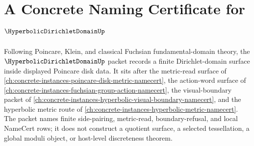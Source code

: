 \chapter{A Concrete Naming Certificate for $\HyperbolicDirichletDomainUp$}
\label{ch:concrete-instances-hyperbolic-dirichlet-domain-namecert}

Following Poincare, Klein, and classical Fuchsian fundamental-domain theory, the $\HyperbolicDirichletDomainUp$ packet records a finite Dirichlet-domain surface inside displayed Poincare disk data. It sits after the metric-read surface of \autoref{ch:concrete-instances-poincare-disk-metric-namecert}, the action-word surface of \autoref{ch:concrete-instances-fuchsian-group-action-namecert}, the visual-boundary packet of \autoref{ch:concrete-instances-hyperbolic-visual-boundary-namecert}, and the hyperbolic metric route of \autoref{ch:concrete-instances-hyperbolic-metric-namecert}. The packet names finite side-pairing, metric-read, boundary-refusal, and local NameCert rows; it does not construct a quotient surface, a selected tessellation, a global moduli object, or host-level discreteness theorem.


